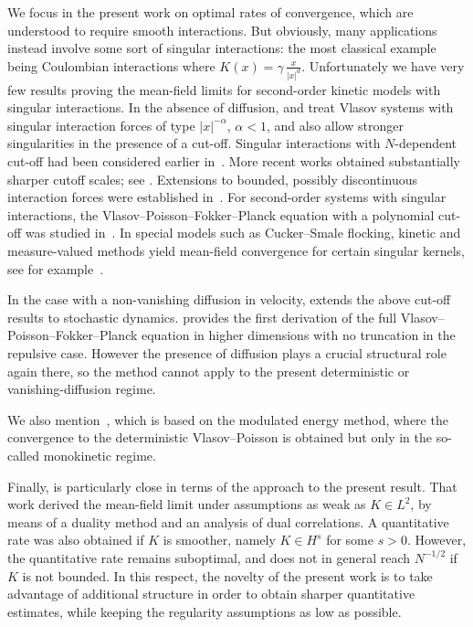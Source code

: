 \documentclass[pdflatex,sn-mathphys-num]{sn-jnl}
\theoremstyle{thmstyleone}%
\theoremstyle{thmstyletwo}%
\theoremstyle{thmstylethree}%
\begin{document}
We focus in the present work on optimal rates of convergence, which are understood to require smooth interactions. But obviously, many applications instead involve some sort of singular interactions: the most classical example being Coulombian interactions where $K(x)=\gamma\,\frac{x}{|x|^d}$. Unfortunately we have very few results proving the mean-field limits for second-order kinetic models with singular interactions. In the absence of diffusion, \cite{hauray2007n}  and \cite{hauray2015particle} treat Vlasov systems with singular interaction forces of type \(|x|^{-\alpha}\), \(\alpha<1\), and also allow stronger singularities in the presence of a cut-off. Singular interactions with  \(N\)-dependent cut-off had been considered earlier in~\cite{ganguly1989convergence,ganguly1991simulation,victory1991convergence,wollman2000approximation}. More recent works obtained substantially sharper cutoff scales; see \cite{lazarovici2016vlasov,lazarovici2017mean, huang2020mean}. Extensions to bounded, possibly discontinuous interaction forces were established in~\cite{jabin2016mean}. For second-order systems with singular interactions, the Vlasov–Poisson–Fokker–Planck equation with a polynomial cut-off was studied in~\cite{carrillo2019propagation}.  In special models such as Cucker–Smale flocking, kinetic and measure-valued methods yield mean-field convergence for certain singular kernels, see for example~\cite{mucha2018cucker}.


In the case with a non-vanishing diffusion in velocity, \cite{huang2020mean} extends the above cut-off results to stochastic dynamics. \cite{bresch2025new} provides the first derivation of the full Vlasov–Poisson–Fokker–Planck equation in higher dimensions with no truncation in the repulsive case.  However the presence of diffusion plays a crucial structural role again there, so the method cannot apply to the present deterministic or vanishing-diffusion regime.

We also mention~\cite{serfaty2020mean}, which is based on the modulated energy method, where the convergence to the deterministic Vlasov--Poisson is obtained but only in the so-called monokinetic regime. 


Finally, \cite{bresch2024duality} is particularly close in terms of the approach to the present result. That work derived the mean-field limit under assumptions as weak as \(K\in L^{2}\), by means of a duality method and an analysis of dual correlations. A quantitative rate was also obtained if $K$ is smoother, namely $K\in H^s$ for some $s>0$. However, the quantitative rate remains suboptimal, and does not in general reach $N^{-1/2}$ if $K$ is not bounded. In this respect, the novelty of the present work is to take advantage of  additional structure in order to obtain sharper quantitative estimates, while keeping the regularity assumptions as low as possible.
\end{document}
